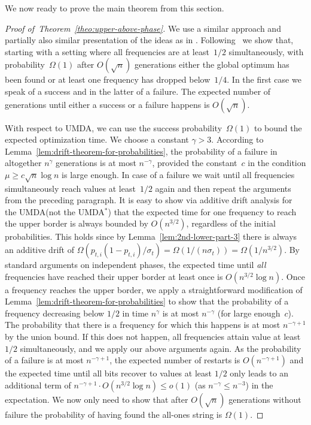 \documentclass[11pt, a4paper]{article}
\newcommand{\umdastar}{UMDA$^*$\xspace}
\newcommand{\umda}{UMDA\xspace}
\newenvironment{proofof}[1]{\begin{proof}[Proof of~#1]}{\end{proof}}
\begin{document}
We now ready to prove the main theorem from this section.

\begin{proofof}{Theorem~\ref{theo:upper-above-phase}}
We use a similar approach and partially also similar presentation of the ideas
 as in \cite{SudholtWitt2016}.
Following~\cite[Theorem~3]{Neumann2010a} we show that, starting with a setting where all 
frequencies are at least~$1/2$ simultaneously,
with probability~$\Omega(1)$ after $O(\sqrt{n})$ generations either
the global optimum has been found or at least one frequency has dropped below~$1/4$.
In the first case we speak of a success and in the latter   of a failure.
The expected number of generations until either a success or a failure
happens is $O(\sqrt{n})$.

With respect to \umda, we can use the success probability~$\Omega(1)$ 
to bound the expected optimization time. 
We choose a constant $\gamma > 3$. 
According to Lemma~\ref{lem:drift-theorem-for-probabilities}, the probability of a failure
in altogether $n^{\gamma}$ generations is at most $n^{-\gamma}$, provided the constant~$c$ in the condition $\mu \ge c\sqrt{n}\log n$ is large enough.
In case of a failure we wait until all frequencies
simultaneously reach values at least~$1/2$ again and then repeat the arguments from the preceding paragraph.
It is easy to show via additive drift analysis for the \umda (not the \umdastar) 
 that the expected time for one frequency 
to reach the upper border is always bounded by $O(n^{3/2})$, regardless of the initial probabilities. This holds  
since by Lemma~\ref{lem:2nd-lower-part-3} there is always an additive drift of 
$\Omega(p_{t,i}(1-p_{t,i})/\sigma_t)=\Omega(1/(n\sigma_t))=\Omega(1/n^{3/2})$. 
By standard arguments on independent phases, the expected time until \emph{all} frequencies 
have reached their upper border at least once is $O(n^{3/2} \log n)$.
Once a frequency reaches the upper border, we apply a straightforward modification of Lemma~\ref{lem:drift-theorem-for-probabilities} 
 to show that the probability of a frequency decreasing below $1/2$ in time $n^{\gamma}$ is at 
most $n^{-\gamma}$ (for large enough~$c$). The probability that there is a frequency
 for which this happens is at most $n^{-\gamma + 1}$ by the union bound. If this does not happen, all frequencies 
attain value at least $1/2$ simultaneously, and we apply our above arguments again.
As the probability of a failure is at most $n^{-\gamma+1}$, the expected number of restarts is $O(n^{-\gamma+1})$
and the expected time until all bits recover to values at least $1/2$ only leads to
an additional term of $n^{-\gamma+1} \cdot O(n^{3/2} \log n) \le  o(1)$ (as $n^{-\gamma} \le n^{-3}$) in the expectation.
We now only need to show that after $O(\sqrt{n})$ generations without failure
the probability of having found the all-ones string is $\Omega(1)$.



\end{proofof}
\end{document}
